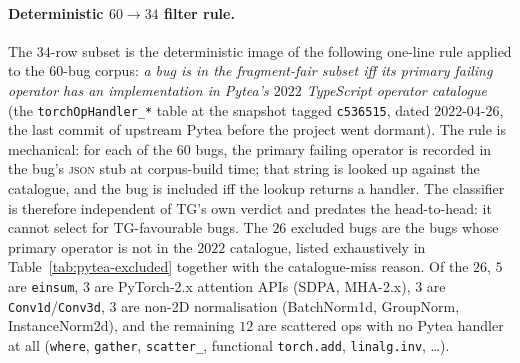 \paragraph{Deterministic $60{\to}34$ filter rule.}
The $34$-row subset is the deterministic image of the
following one-line rule applied to the $60$-bug corpus:
\emph{a bug is in the fragment-fair subset iff its primary
failing operator has an implementation in Pytea's $2022$
TypeScript operator catalogue} (the
\texttt{torchOpHandler\_*} table at the snapshot tagged
\texttt{c536515}, dated $2022\text{-}04\text{-}26$, the
last commit of upstream Pytea before the project went dormant).
The rule is mechanical: for each of the $60$ bugs, the primary
failing operator is recorded in the bug's \textsc{json} stub at
corpus-build time; that string is looked up against the
catalogue, and the bug is included iff the lookup returns a
handler. The classifier is therefore independent of TG's own
verdict and predates the head-to-head: it cannot select for
TG-favourable bugs. The $26$ excluded bugs are the bugs whose
primary operator is not in the $2022$ catalogue, listed exhaustively in
Table~\ref{tab:pytea-excluded} together with the catalogue-miss
reason. Of the $26$, $5$ are \texttt{einsum}, $3$ are PyTorch-2.x
attention APIs (SDPA, MHA-2.x), $3$ are \texttt{Conv1d}/\texttt{Conv3d},
$3$ are non-2D normalisation (BatchNorm1d, GroupNorm,
InstanceNorm2d), and the remaining $12$ are scattered ops with no
Pytea handler at all (\texttt{where}, \texttt{gather},
\texttt{scatter\_}, functional \texttt{torch.add},
\texttt{linalg.inv}, \dots).

